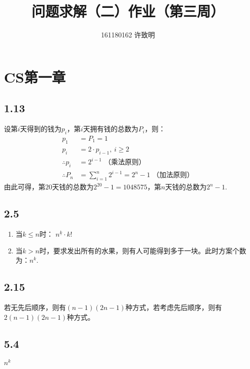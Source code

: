 \documentclass[twocolumn]{article}
\begin{document}
	\title{问题求解（二）作业（第三周）}\author{161180162 许致明}\maketitle
	\section*{CS第一章}
	\subsection*{1.13}
	设第$i$天得到的钱为$p_i$，第$i$天拥有钱的总数为$P_i$，则：
	\[
	\begin{aligned}
		p_1&=P_1=1\\
		p_{i}&=2\cdot p_{i-1},\ i\ge 2\\
		\therefore p_i&=2^{i-1}\text{	（乘法原则）}\\
		\therefore P_n&=\sum_{i=1}^{n}2^{i-1}=2^{n}-1\text{	（加法原则）}
	\end{aligned}
	\]
	由此可得，第$20$天钱的总数为$2^{20}-1=1048575$，第$n$天钱的总数为$2^n-1$.
	\subsection*{2.5}
	\begin{enumerate}[(1)]
		\item 当$k\le n$时：
		$n^{\underline{k}}\cdot k!$
		\item 当$k>n$时，要求发出所有的水果，则有人可能得到多于一块。此时方案个数为：$n^k$.
	\end{enumerate}
	\subsection*{2.15}
	若无先后顺序，则有$(n-1)(2n-1)$种方式，若考虑先后顺序，则有$2(n-1)(2n-1)$种方式。
	\subsection*{5.4}
	$n^k$
\end{document}
